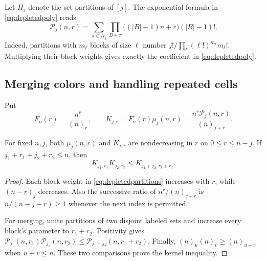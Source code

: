 Let $\Pi_j$ denote the set partitions of $[j]$. The exponential formula in \eqref{eq:depletedpoly} reads
\begin{equation}\label{eq:depletedpartitions}
\mathcal P_j(n,r)=
\sum_{\pi\in\Pi_j}\prod_{B\in\pi}
\bigl((|B|-1)n+r\bigr)(|B|-1)!.
\end{equation}
Indeed, partitions with $m_\ell$ blocks of size $\ell$ number
$j!/\prod_\ell(\ell!)^{m_\ell}m_\ell!$. Multiplying their block weights gives exactly the coefficient in \eqref{eq:depletedpoly}.

\subsection{Merging colors and handling repeated cells}

Put
\[
F_n(r)=\frac{n^r}{(n)_r},\qquad
K_{j,r}=F_n(r)\mu_j(n,r)
=\frac{n^r\mathcal P_j(n,r)}{(n)_{j+r}}.
\]
\begin{lemma}\label{lem:mixedmerge}
For fixed $n,j$, both $\mu_j(n,r)$ and $K_{j,r}$ are nondecreasing in $r$ on $0\le r\le n-j$. If $j_1+r_1+j_2+r_2\le n$, then
\[
K_{j_1,r_1}K_{j_2,r_2}\le K_{j_1+j_2,r_1+r_2}.
\]
\end{lemma}
\begin{proof}
Each block weight in \eqref{eq:depletedpartitions} increases with $r$, while $(n-r)_j$ decreases. Also the successive ratio of $n^r/(n)_{j+r}$ is $n/(n-j-r)\ge1$ whenever the next index is permitted.

For merging, unite partitions of two disjoint labeled sets and increase every block's parameter to $r_1+r_2$. Positivity gives
$\mathcal P_{j_1}(n,r_1)\mathcal P_{j_2}(n,r_2)
\le\mathcal P_{j_1+j_2}(n,r_1+r_2)$.
Finally, $(n)_u(n)_v\ge(n)_{u+v}$ when $u+v\le n$. These two comparisons prove the kernel inequality.
\end{proof}

